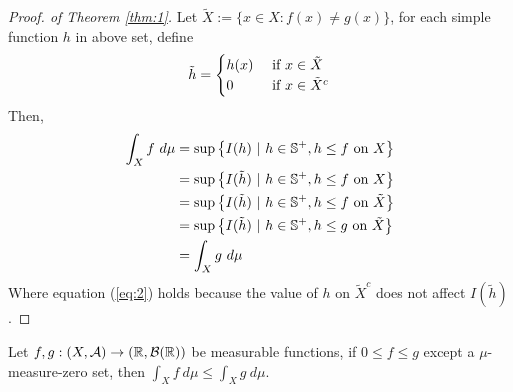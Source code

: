 \documentclass[11pt]{article}
\numberwithin{equation}{section}
\begin{document}
	\begin{proof}[Proof. of Theorem \ref{thm:1}]
		Let $\tilde{X} := \{x \in X: f(x) \neq g(x)\}$, for each simple function $h$ in above set, define
		\begin{align}
			\tilde{h} = \begin{cases}
				h(x) &\text{{ if }} x \in \tilde{X} \\
				0 &\text{{ if }} x \in \tilde{X}^c
			\end{cases}
		\end{align}
		Then,
		\begin{align}
			\int_X f\ d\mu &= \sup \left \{I(h)\ |\ h \in \mathbb{S}^+, h \leq f \text{{ on }} X \right\} \\
			&= \sup \left \{I(\tilde{h})\ |\ {h} \in \mathbb{S}^+, {h} \leq f \text{{ on }} {X} \right\} \\
			&= \sup \left \{I(\tilde{h})\ |\ {h} \in \mathbb{S}^+, {h} \leq f \text{{ on }} \tilde{X} \right\} \label{eq:2}\\
			&= \sup \left \{I(\tilde{h})\ |\ {h} \in \mathbb{S}^+, {h} \leq g \text{{ on }} \tilde{X} \right\} \\
			&= \int_X g\ d\mu
		\end{align}
		Where equation (\ref{eq:2}) holds because the value of $h$ on $\tilde{X}^c$ does not affect $I(\tilde{h})$.
	\end{proof}

	\begin{theorem}
		Let $f, g: (X, \mathcal{{A}}) \to (\mathbb{R}, \mathcal{{B}}(\mathbb{R}))$ be measurable functions, if $0 \leq f \leq g$ except a $\mu$-measure-zero set, then $\int_X f\ d\mu \leq \int_X g\ d\mu$.
	\end{theorem}
	
\end{document}
